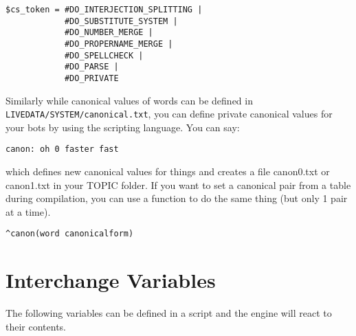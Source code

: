 \documentclass[]{article}
\begin{document}
\begin{verbatim}
$cs_token = #DO_INTERJECTION_SPLITTING | 
            #DO_SUBSTITUTE_SYSTEM |
            #DO_NUMBER_MERGE | 
            #DO_PROPERNAME_MERGE |
            #DO_SPELLCHECK | 
            #DO_PARSE | 
            #DO_PRIVATE
\end{verbatim}

Similarly while canonical values of words can be defined in
\texttt{LIVEDATA/SYSTEM/canonical.txt}, you can define private canonical
values for your bots by using the scripting language. You can say:

\begin{verbatim}
canon: oh 0 faster fast
\end{verbatim}

which defines new canonical values for things and creates a file
canon0.txt or canon1.txt in your TOPIC folder. If you want to set a
canonical pair from a table during compilation, you can use a function
to do the same thing (but only 1 pair at a time).

\begin{verbatim}
^canon(word canonicalform)
\end{verbatim}

\section{Interchange Variables}\label{interchange-variables}

The following variables can be defined in a script and the engine will
react to their contents.
\end{document}
